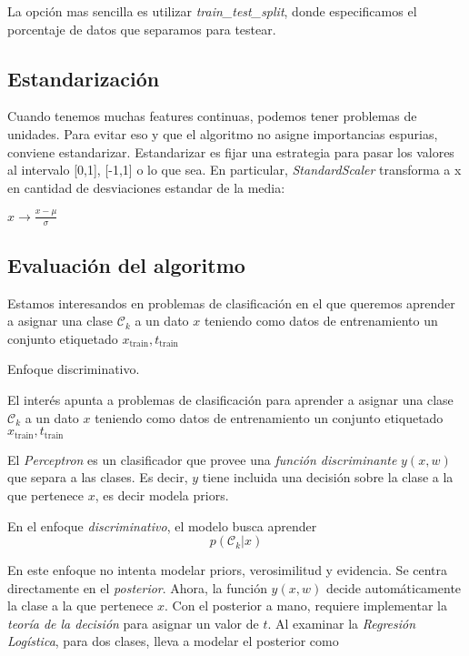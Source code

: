 \documentclass[twoside,11pt]{article}
\begin{document}
La opción mas sencilla es utilizar \textit{train\_test\_split}, donde especificamos el porcentaje 
de datos que separamos para testear.

\subsection{Estandarización}
Cuando tenemos muchas features continuas, podemos tener problemas de unidades. 
Para evitar eso y que el algoritmo no asigne importancias espurias, conviene estandarizar. 
Estandarizar es fijar una estrategia para pasar los valores al intervalo [0,1], [-1,1] o lo que sea.
En particular,  \textit{StandardScaler} transforma a x en cantidad de desviaciones estandar de la media:

$x\rightarrow \frac{x-\mu}{\sigma}$

\subsection{Evaluación del algoritmo}
Estamos interesandos en problemas de clasificación en el que queremos aprender a asignar 
una clase $\mathcal{C}_{k}$ a un dato $x$ teniendo como datos de entrenamiento un conjunto 
etiquetado $x_{\text{train}},t_{\text{train}}$

Enfoque discriminativo.

El interés apunta a problemas de clasificación para aprender a asignar una clase $\mathcal{C}_{k}$
a un dato $x$ teniendo como datos de entrenamiento un conjunto etiquetado $x_{\text{train}},t_{\text{train}}$

El \textit{Perceptron} es un clasificador que provee una \textit{función discriminante} $y(x,w)$ que separa a
las clases. Es decir, $y$ tiene incluida una decisión sobre la clase a la que pertenece $x$, es decir modela 
priors.

En el enfoque \textit{discriminativo}, el modelo busca aprender\\

$$p(\mathcal{C}_{k}|x)$$

En este enfoque no intenta modelar priors, verosimilitud y evidencia. Se centra directamente 
en el \textit{posterior}. Ahora, la función $y(x,w)$ decide automáticamente la clase a la que pertenece $x$. 
Con el posterior a mano, requiere implementar la \textit{teoría de la decisión} para asignar un valor de $t$.
Al examinar la \textit{Regresión Logística}, para dos clases, lleva a modelar el posterior como\\
\end{document}
